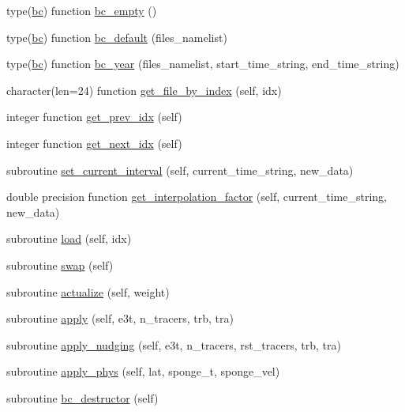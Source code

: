 \begin{DoxyCompactItemize}
\item 
type(\mbox{\hyperlink{structbc__mod_1_1bc}{bc}}) function \mbox{\hyperlink{namespacebc__mod_ae334c602c9a98a75ca25a7af333bb845}{bc\+\_\+empty}} ()
\item 
type(\mbox{\hyperlink{structbc__mod_1_1bc}{bc}}) function \mbox{\hyperlink{namespacebc__mod_a67873e29b428f5525f9cb12426dafa43}{bc\+\_\+default}} (files\+\_\+namelist)
\item 
type(\mbox{\hyperlink{structbc__mod_1_1bc}{bc}}) function \mbox{\hyperlink{namespacebc__mod_a394924f0b959c0b53a721661a6c81249}{bc\+\_\+year}} (files\+\_\+namelist, start\+\_\+time\+\_\+string, end\+\_\+time\+\_\+string)
\item 
character(len=24) function \mbox{\hyperlink{namespacebc__mod_a8a4134af9602c4532eb9698c4ab7f5a1}{get\+\_\+file\+\_\+by\+\_\+index}} (self, idx)
\item 
integer function \mbox{\hyperlink{namespacebc__mod_a5caff070a863ad08db22d85ca7e0b8b9}{get\+\_\+prev\+\_\+idx}} (self)
\item 
integer function \mbox{\hyperlink{namespacebc__mod_a783b0c98351bbb1c0f2262e54ab0ab84}{get\+\_\+next\+\_\+idx}} (self)
\item 
subroutine \mbox{\hyperlink{namespacebc__mod_a54709c03d02b3a537c61ef98ce464ac6}{set\+\_\+current\+\_\+interval}} (self, current\+\_\+time\+\_\+string, new\+\_\+data)
\item 
double precision function \mbox{\hyperlink{namespacebc__mod_a94b8128bcc59330c1612f58d95bd6b33}{get\+\_\+interpolation\+\_\+factor}} (self, current\+\_\+time\+\_\+string, new\+\_\+data)
\item 
subroutine \mbox{\hyperlink{namespacebc__mod_a3804f8b1aae5d58c9bb3f7fa88ff29c9}{load}} (self, idx)
\item 
subroutine \mbox{\hyperlink{namespacebc__mod_a248045244b644d0fca3b061f2baf93a7}{swap}} (self)
\item 
subroutine \mbox{\hyperlink{namespacebc__mod_abfb3c3416dd78fb3d2ce69a6574dfd41}{actualize}} (self, weight)
\item 
subroutine \mbox{\hyperlink{namespacebc__mod_afabd5e4d5da39a09c755200972516648}{apply}} (self, e3t, n\+\_\+tracers, trb, tra)
\item 
subroutine \mbox{\hyperlink{namespacebc__mod_ad4804bde248994bc86adf15286b68d7a}{apply\+\_\+nudging}} (self, e3t, n\+\_\+tracers, rst\+\_\+tracers, trb, tra)
\item 
subroutine \mbox{\hyperlink{namespacebc__mod_ac83f910c3a8db513c1a4952f650b279c}{apply\+\_\+phys}} (self, lat, sponge\+\_\+t, sponge\+\_\+vel)
\item 
subroutine \mbox{\hyperlink{namespacebc__mod_a27478494ca4ab470a05ec781192c89e4}{bc\+\_\+destructor}} (self)
\end{DoxyCompactItemize}


